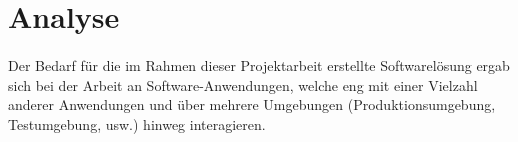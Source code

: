 \section{Analyse}
\paragraph{}
Der Bedarf für die im Rahmen dieser Projektarbeit erstellte Softwarelösung ergab
sich bei der Arbeit an Software-Anwendungen, welche eng mit einer Vielzahl
anderer Anwendungen und über mehrere Umgebungen (Produktionsumgebung, Testumgebung, usw.)
hinweg interagieren.



 \label{Sollzustand}

